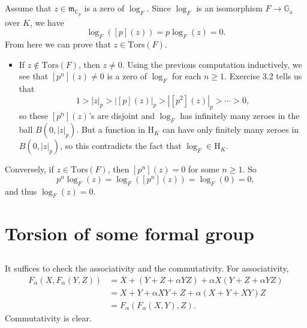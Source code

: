 \documentclass{article}
\theoremstyle{definition}
\theoremstyle{remark}
\newcommand{\C}{\mathbb{C}}
\newcommand{\m}{\mathfrak{m}}
\begin{document}
\subsection{}
Assume that $z\in\m_{\C_p}$ is a zero of $\log_F$.
Since $\log_F$ is an isomorphism $F\to\mathbb{G}_\mathrm{a}$ over $K$, we have \[\log_F([p](z)) = p\log_F(z) = 0.\]
From here we can prove that $z\in\mathrm{Tors}(F)$.
\begin{itemize}
    \item If $z\notin\mathrm{Tors}(F)$, then $z\ne 0$.
    Using the previous computation inductively, we see that $[p^n](z)\ne 0$ is a zero of $\log_F$ for each $n\ge 1$.
    Exercise 3.2 tells us that \[1 > |z|_p > |[p](z)|_p > |[p^2](z)|_p > \cdots > 0,  \]
    so these $[p^n](z)$'s are disjoint and $\log_F$ has infinitely many zeroes in the ball $B(0, |z|_p)$. But a function in $\mathrm H_K$ can have only finitely many zeroes in $B(0, |z|_p)$,
    so this contradicts the fact that $\log_F\in\mathrm{H}_K$.    
\end{itemize}
Conversely, if $z\in\mathrm{Tors}(F)$, then $[p^n](z) = 0$ for some $n\ge 1$.
So \[p^n\log_F(z) = \log_F([p^n](z)) = \log_F(0) = 0,\]
and thus $\log_F(z) = 0$.

\section{Torsion of some formal group}
\subsection{}
It suffices to check the associativity and the commutativity.
For associativity,\begin{align*}
    F_\alpha(X, F_\alpha(Y, Z)) &= X + (Y + Z + \alpha YZ) + \alpha X(Y + Z + \alpha YZ)\\
    &=X + Y + \alpha XY + Z + \alpha (X + Y + XY)Z \\
    &=F_\alpha(F_\alpha(X, Y), Z).
\end{align*}
Commutativity is clear.
\end{document}
